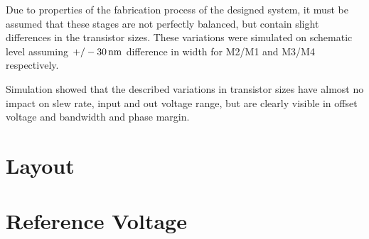 \documentclass[parskip,oneside,colorbacktitle,10pt,accentcolor=tud1b]{tudreport}
\begin{document}
{Due to properties of the fabrication process of the designed system, it must be assumed that these stages are not perfectly balanced, but contain slight differences in the transistor sizes. These variations were simulated on schematic level assuming $+/-\unit[30]{nm}$ difference in width for M2/M1 and M3/M4 respectively.

Simulation showed that the described variations in transistor sizes have almost no impact on slew rate, input and out voltage range, but are clearly visible in offset voltage and bandwidth and phase margin.

\begin{figure}[H]
     \begin{center}
    \end{center}
\end{figure}

\section{Layout}

\section{Reference Voltage}

}
\end{document}
